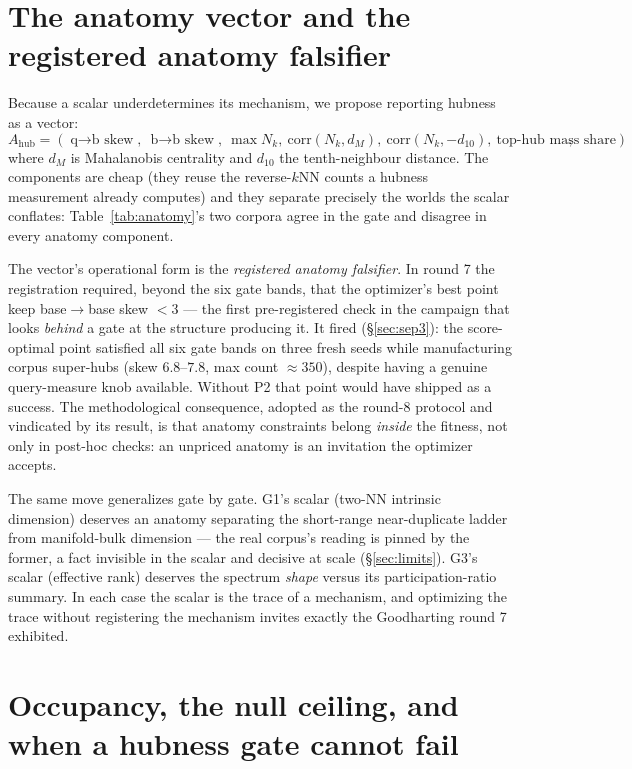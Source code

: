 \documentclass[11pt]{article}
\begin{document}
\section{The anatomy vector and the registered anatomy falsifier}\label{sec:anatomy}

Because a scalar underdetermines its mechanism, we propose reporting hubness
as a vector:
\[
A_{\mathrm{hub}} = (\text{q$\to$b skew},\ \text{b$\to$b skew},\ \max N_k,\
\mathrm{corr}(N_k, d_M),\ \mathrm{corr}(N_k, -d_{10}),\ \text{top-hub mass share}),
\]
where $d_M$ is Mahalanobis centrality and $d_{10}$ the tenth-neighbour
distance. The components are cheap (they reuse the reverse-$k$NN counts a
hubness measurement already computes) and they separate precisely the worlds
the scalar conflates: Table~\ref{tab:anatomy}'s two corpora agree in the
gate and disagree in every anatomy component.

The vector's operational form is the \emph{registered anatomy falsifier}. In
round 7 the registration required, beyond the six gate bands, that the
optimizer's best point keep base$\to$base skew $< 3$ --- the first
pre-registered check in the campaign that looks \emph{behind} a gate at the
structure producing it. It fired (\S\ref{sec:sep3}): the score-optimal point
satisfied all six gate bands on three fresh seeds while manufacturing corpus
super-hubs (skew $6.8$--$7.8$, max count ${\approx}350$), despite having a
genuine query-measure knob available. Without P2 that point would have
shipped as a success. The methodological consequence, adopted as the round-8
protocol and vindicated by its result, is that anatomy constraints belong
\emph{inside} the fitness, not only in post-hoc checks: an unpriced anatomy
is an invitation the optimizer accepts.

The same move generalizes gate by gate. G1's scalar (two-NN intrinsic
dimension) deserves an anatomy separating the short-range near-duplicate
ladder from manifold-bulk dimension --- the real corpus's reading is pinned
by the former, a fact invisible in the scalar and decisive at scale
(\S\ref{sec:limits}). G3's scalar (effective rank) deserves the spectrum
\emph{shape} versus its participation-ratio summary. In each case the scalar
is the trace of a mechanism, and optimizing the trace without registering
the mechanism invites exactly the Goodharting round 7 exhibited.

\section{Occupancy, the null ceiling, and when a hubness gate cannot fail}
\label{sec:occupancy}
\end{document}
